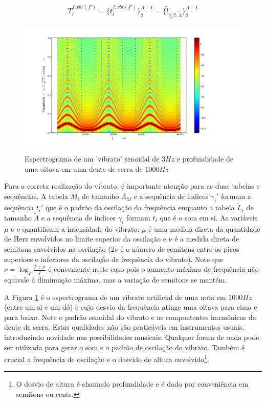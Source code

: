 \begin{equation}\label{vbrT}
T_i^{f, vbr(f')}=\{ t_i^{f,vbr(f')} \}_0^{\Lambda-1}=\{ \widetilde{l}_{\gamma_i \%\; \widetilde{\Lambda} } \}_0^{\Lambda-1}
\end{equation}


\begin{figure}[h!]
    \centering
    \caption{Espectrograma de um 'vibrato' senoidal de $3Hz$ e profundidade de uma oitava em uma dente de serra de $1000Hz$}
        \includegraphics[width=\textwidth]{figuras/vibrato___}
        \label{fig:vibrato}
\end{figure}

Para a correta realização do vibrato, é importante atenção para as duas tabelas e sequências.
A tabela $\widetilde{M}_i$ de tamanho $\widetilde{\Lambda}_M$ e a sequência de índices $\gamma_i'$ formam a sequência $t_i'$
 que é o padrão da oscilação da frequência enquanto
a tabela $\widetilde{L}_i$ de tamanho $\widetilde{\Lambda}$ e a sequência de índices $\gamma_i$ formam $t_i$ que é o som em si.
As variáveis $\mu$ e $\nu$ quantificam a intensidade do vibrato: $\mu$ é uma medida direta da quantidade
de Herz envolvidos no limite superior da oscilação e $\nu$ é a medida direta de semitons envolvidos na oscilação ($2\nu$ é o número de semitons entre os picos superioes e inferiores da oscilação de frequência do vibrato).
Note que $\nu=\log_{2}\frac{f+\mu}{f} $ é conveniente neste caso pois o aumento máximo de frequência
não equivale à diminuição máxima, mas a variação de semitons se mantém.

A Figura \ref{fig:vibrato} é o espectrograma de um vibrato artificial de uma nota em
$1000Hz$ (entre um si e um dó) e cujo desvio da frequência atinge uma oitava
para cima e para baixo. Note o padrão senoidal do vibrato e as compontentes harmônicas
da dente de serra. Estas qualidades não são praticáveis em instrumentos
usuais, introduzindo novidade nas possibilidades musicais. Qualquer forma de onda pode
ser utilizada para gerar o som e o padrão de oscilação do vibrato. Também é crucial a
frequência de oscilação e o desvido de altura envolvido\footnote{O desvio de altura
é chamado profundidade e é dado por conveniência em semitons ou cents.}.

